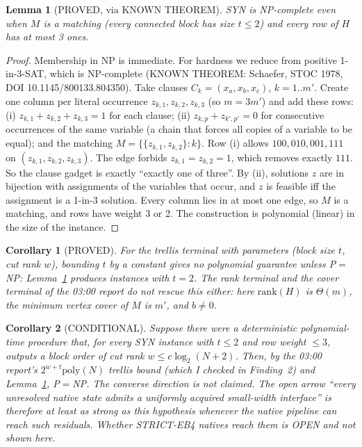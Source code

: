 \documentclass[11pt]{article}
\newtheorem{lemma}{Lemma}
\newtheorem{corollary}{Corollary}
\theoremstyle{definition}
\begin{document}
\begin{lemma}[PROVED, via KNOWN THEOREM]\label{lem:syn}
SYN is NP-complete even when $M$ is a matching (every connected block has size $t\le 2$) and every row of $H$ has at most 3 ones.
\end{lemma}
\begin{proof}
Membership in NP is immediate. For hardness we reduce from positive 1-in-3-SAT, which is NP-complete (KNOWN THEOREM: Schaefer, STOC 1978, DOI 10.1145/800133.804350). Take clauses $C_k=(x_{a},x_{b},x_{c})$, $k=1..m'$. Create one column per literal occurrence $z_{k,1},z_{k,2},z_{k,3}$ (so $m=3m'$) and add these rows:
(i) $z_{k,1}+z_{k,2}+z_{k,3}=1$ for each clause;
(ii) $z_{k,p}+z_{k',p'}=0$ for consecutive occurrences of the same variable (a chain that forces all copies of a variable to be equal);
and the matching $M=\{\{z_{k,1},z_{k,2}\}:k\}$.
Row (i) allows $100,010,001,111$ on $(z_{k,1},z_{k,2},z_{k,3})$. The edge forbids $z_{k,1}=z_{k,2}=1$, which removes exactly $111$. So the clause gadget is exactly ``exactly one of three''. By (ii), solutions $z$ are in bijection with assignments of the variables that occur, and $z$ is feasible iff the assignment is a 1-in-3 solution. Every column lies in at most one edge, so $M$ is a matching, and rows have weight 3 or 2. The construction is polynomial (linear) in the size of the instance.
\end{proof}

\begin{corollary}[PROVED]\label{cor:t}
For the trellis terminal with parameters (block size $t$, cut rank $w$), bounding $t$ by a constant gives no polynomial guarantee unless P$=$NP: Lemma~\ref{lem:syn} produces instances with $t=2$. The rank terminal and the cover terminal of the 03:00 report do not rescue this either: here $\mathrm{rank}(H)$ is $\Theta(m)$, the minimum vertex cover of $M$ is $m'$, and $b\neq 0$.
\end{corollary}

\begin{corollary}[CONDITIONAL]\label{cor:cond}
Suppose there were a deterministic polynomial-time procedure that, for every SYN instance with $t\le 2$ and row weight $\le 3$, outputs a block order of cut rank $w\le c\log_2(N+2)$. Then, by the 03:00 report's $2^{w+t}\mathrm{poly}(N)$ trellis bound (which I checked in Finding~2) and Lemma~\ref{lem:syn}, P$=$NP. The converse direction is \emph{not} claimed. The open arrow ``every unresolved native state admits a uniformly acquired small-width interface'' is therefore at least as strong as this hypothesis whenever the native pipeline can reach such residuals. Whether STRICT-EB4 natives reach them is OPEN and not shown here.
\end{corollary}
\end{document}
